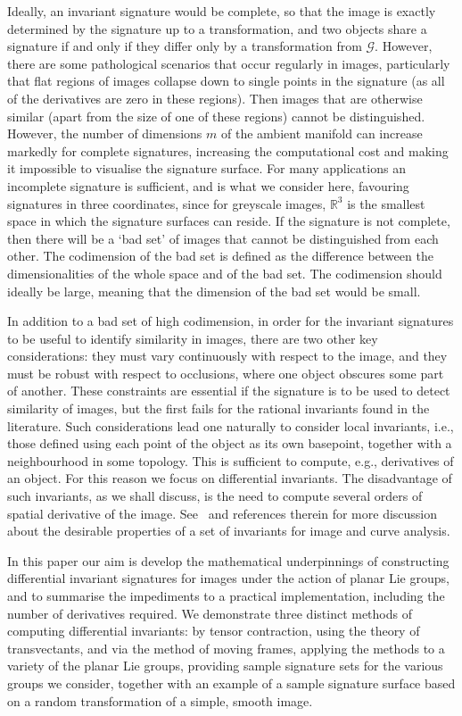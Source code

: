 \documentclass[review,onefignum,onetabnum]{siamonline190516}
\begin{document}
Ideally, an invariant signature would be complete, so that the image is exactly determined by the signature up to a transformation, and two objects share a signature if and only if they differ only by a transformation from $\mathcal{G}$. However, there are some pathological scenarios that occur regularly in images, particularly that flat regions of images collapse down to single points in the signature (as all of the derivatives are zero in these regions). Then images that are otherwise similar (apart from the size of one of these regions) cannot be distinguished. However, the number of dimensions $m$ of the ambient manifold can increase markedly for complete signatures, increasing the computational cost and making it impossible to visualise the signature surface. For many applications an incomplete signature is sufficient, and is what we consider here, favouring signatures in three coordinates, since for greyscale images, $\mathbb{R}^3$ is the smallest space in which the signature surfaces can reside.  If the signature is not complete, then there will be a `bad set' of images that cannot be distinguished from each other.  The codimension of the bad set is defined as the difference between the dimensionalities of the whole space and of the bad set. The codimension should ideally be large, meaning that the dimension of the bad set would be small. 

In addition to a bad set of high codimension, in order for the invariant signatures to be useful to identify similarity in images, there are two other key considerations: they must vary continuously with respect to the image, and they must be robust with respect to occlusions, where one object obscures some part of another. These constraints are essential if the signature is to be used to detect similarity of images, but the first fails for the rational invariants found in the literature. Such considerations lead one naturally to consider local invariants, i.e., those defined using each point of the object as its own basepoint, together with a neighbourhood in some topology. This is sufficient to compute, e.g., derivatives of an object. For this reason we focus on differential invariants. The disadvantage of such invariants, as we shall discuss, is the need to compute several orders of spatial derivative of the image. See~\citet{UsMobius} and references therein for more discussion about the desirable properties of a set of invariants for image and curve analysis. 

In this paper our aim is develop the mathematical underpinnings of constructing differential invariant signatures for images under the action of planar Lie groups, and to summarise the impediments to a practical implementation, including the number of derivatives required. We demonstrate three distinct methods of computing differential invariants: by tensor contraction, using the theory of transvectants, and via the method of moving frames, applying the methods to a variety of the planar Lie groups, providing sample signature sets for the various groups we consider, together with an example of a sample signature surface based on a random transformation of a simple, smooth image.
\end{document}
